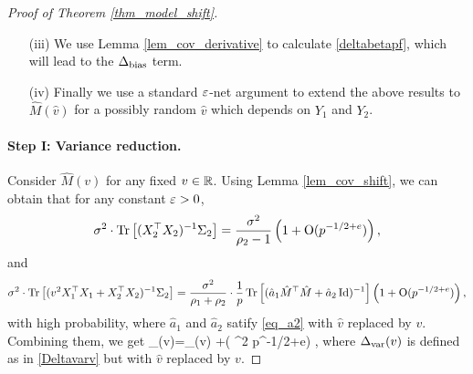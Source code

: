 \begin{proof}[Proof of Theorem \ref{thm_model_shift}]
\begin{itemize}
\item[(iii)] We use Lemma \ref{lem_cov_derivative} to calculate \eqref{deltabetapf}, which will lead to the $\Delta_{\text{bias}}$ term.

\item[(iv)] Finally we use a standard ${\varepsilon}$-net argument to extend the above results to $\hat M(\hat v)$ for a possibly random $\hat v$ which depends on $Y_1$ and $Y_2$.
\end{itemize}


\paragraph{Step I: Variance reduction.} Consider $\hat M(v)$ for any fixed $v\in \mathbb{R}$. Using Lemma \ref{lem_cov_shift}, we can obtain that for any constant ${\varepsilon}>0$, 
$$  \sigma^2 \cdot \operatorname{Tr}\left[(X_2^{\top}X_2)^{-1}\Sigma_2\right] = \frac{\sigma^2}{\rho_2-1}\left( 1+ \operatorname{O}(p^{-1/2+e})\right),$$
and 
$$ \sigma^2 \cdot \operatorname{Tr}\left[( {v}^2 X_1^{\top}X_1 + X_2^{\top}X_2)^{-1} \Sigma_2\right] =   \frac {\sigma^2} {\rho_1 + \rho_2}\cdot \frac1p \operatorname{Tr}\left[(\hat a_1 \hat M^{\top}\hat M + \hat a_2\operatorname{Id})^{-1}\right]\left( 1+ \operatorname{O}(p^{-1/2+e})\right) ,$$
with high probability, where $\hat a_1$ and $\hat a_2$ satify \eqref{eq_a2} with $\hat v$ replaced by $v$. Combining them, we get 
\be\label{deltavaral-} \delta_{\vari}(v)=\Delta_{\vari}(v) +\OO( \sigma^2 p^{-1/2+e}) \quad {},
\ee 
where $\Delta_{\text{var}}(v)$ is defined as in \eqref{Deltavarv} but with $\hat v$ replaced by $v$.




\end{proof}

